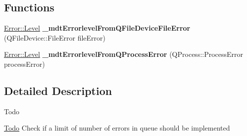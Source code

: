 \subsection*{Functions}
\begin{DoxyCompactItemize}
\item 
\hyperlink{class_mdt_1_1_error_ab533dc690f68a8635232db594194a068}{Error\+::\+Level} {\bfseries \+\_\+mdt\+Errorlevel\+From\+Q\+File\+Device\+File\+Error} (Q\+File\+Device\+::\+File\+Error file\+Error)\hypertarget{namespace_mdt_a257b45c35cbeebcdd09e848d0eb32a24}{}\label{namespace_mdt_a257b45c35cbeebcdd09e848d0eb32a24}

\item 
\hyperlink{class_mdt_1_1_error_ab533dc690f68a8635232db594194a068}{Error\+::\+Level} {\bfseries \+\_\+mdt\+Errorlevel\+From\+Q\+Process\+Error} (Q\+Process\+::\+Process\+Error process\+Error)\hypertarget{namespace_mdt_a695a2c868ea594d886deb671f1a12913}{}\label{namespace_mdt_a695a2c868ea594d886deb671f1a12913}

\end{DoxyCompactItemize}


\subsection{Detailed Description}
\begin{DoxyRefDesc}{Todo}
\item[\hyperlink{todo__todo000005}{Todo}]Check if a limit of number of errors in queue should be implemented \end{DoxyRefDesc}
